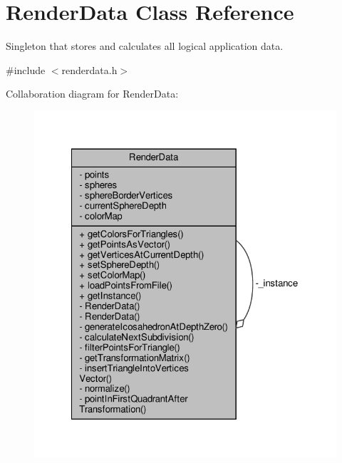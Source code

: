 \hypertarget{class_render_data}{}\section{Render\+Data Class Reference}
\label{class_render_data}


Singleton that stores and calculates all logical application data.  




{\ttfamily \#include $<$renderdata.\+h$>$}



Collaboration diagram for Render\+Data\+:\nopagebreak
\begin{figure}[H]
\begin{center}
\leavevmode
\includegraphics[width=322pt]{class_render_data__coll__graph}
\end{center}
\end{figure}
